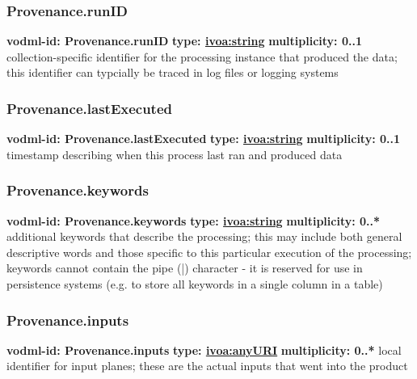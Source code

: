    \subsubsection{Provenance.runID}
      \textbf{vodml-id: Provenance.runID} \newline
      \textbf{type: \hyperref[sect:ivoa]{ivoa:string}} \newline
      \textbf{multiplicity: 0..1} \newline
      collection-specific identifier for the processing instance that produced the data; this identifier can typcially be traced in log files or logging systems

    \subsubsection{Provenance.lastExecuted}
      \textbf{vodml-id: Provenance.lastExecuted} \newline
      \textbf{type: \hyperref[sect:ivoa]{ivoa:string}} \newline
      \textbf{multiplicity: 0..1} \newline
      timestamp describing when this process last ran and produced data

    \subsubsection{Provenance.keywords}
      \textbf{vodml-id: Provenance.keywords} \newline
      \textbf{type: \hyperref[sect:ivoa]{ivoa:string}} \newline
      \textbf{multiplicity: 0..*} \newline
      additional keywords that describe the processing; this may include both general descriptive words and those specific to this particular execution of the processing; keywords cannot contain the pipe (|) character - it is reserved for use in persistence systems (e.g. to store all keywords in a single column in a table)

    \subsubsection{Provenance.inputs}
      \textbf{vodml-id: Provenance.inputs} \newline
      \textbf{type: \hyperref[sect:ivoa]{ivoa:anyURI}} \newline
      \textbf{multiplicity: 0..*} \newline
      local identifier for input planes; these are the actual inputs that went into the product

